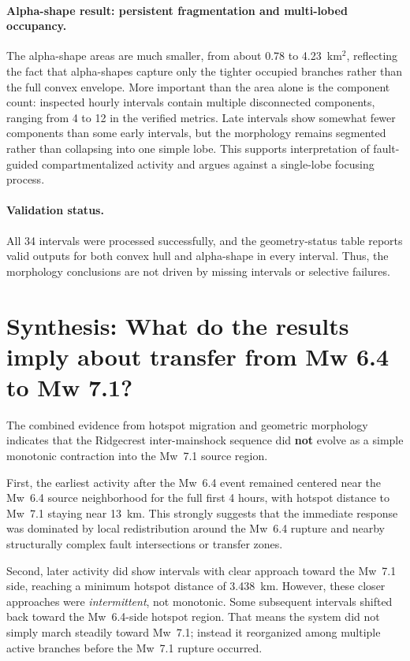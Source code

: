 \documentclass[11pt]{article}
\begin{document}
\paragraph{Alpha-shape result: persistent fragmentation and multi-lobed occupancy.}
The alpha-shape areas are much smaller, from about 0.78 to 4.23~km$^2$, reflecting the fact that alpha-shapes capture only the tighter occupied branches rather than the full convex envelope. More important than the area alone is the component count: inspected hourly intervals contain multiple disconnected components, ranging from 4 to 12 in the verified metrics. Late intervals show somewhat fewer components than some early intervals, but the morphology remains segmented rather than collapsing into one simple lobe. This supports interpretation of fault-guided compartmentalized activity and argues against a single-lobe focusing process.

\paragraph{Validation status.}
All 34 intervals were processed successfully, and the geometry-status table reports valid outputs for both convex hull and alpha-shape in every interval. Thus, the morphology conclusions are not driven by missing intervals or selective failures.

\section{Synthesis: What do the results imply about transfer from Mw 6.4 to Mw 7.1?}
The combined evidence from hotspot migration and geometric morphology indicates that the Ridgecrest inter-mainshock sequence did \textbf{not} evolve as a simple monotonic contraction into the Mw~7.1 source region.

First, the earliest activity after the Mw~6.4 event remained centered near the Mw~6.4 source neighborhood for the full first 4 hours, with hotspot distance to Mw~7.1 staying near 13~km. This strongly suggests that the immediate response was dominated by local redistribution around the Mw~6.4 rupture and nearby structurally complex fault intersections or transfer zones.

Second, later activity did show intervals with clear approach toward the Mw~7.1 side, reaching a minimum hotspot distance of 3.438~km. However, these closer approaches were \emph{intermittent}, not monotonic. Some subsequent intervals shifted back toward the Mw~6.4-side hotspot region. That means the system did not simply march steadily toward Mw~7.1; instead it reorganized among multiple active branches before the Mw~7.1 rupture occurred.
\end{document}
